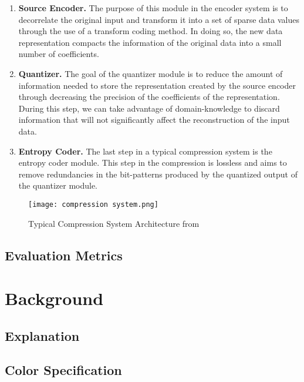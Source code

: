 \documentclass[review,onefignum,onetabnum]{siamart190516}
\begin{document}
\begin{enumerate}[label=\textbf{(\alph*)}]
  \item \textbf{Source Encoder.} 
  The purpose of this module in the encoder system is to decorrelate the original
  input and transform it into a set of sparse data values through the use of a 
  transform coding method. In doing so, the new data representation compacts the
  information of the original data into a small number of coefficients.

  \item \textbf{Quantizer.}
  The goal of the quantizer module is to reduce the amount of information needed
  to store the representation created by the source encoder through decreasing 
  the precision of the coefficients of the representation. During this step,
  we can take advantage of domain-knowledge to discard information that will not
  significantly affect the reconstruction of the input data.

  \item \textbf{Entropy Coder.}
  The last step in a typical compression system is the entropy coder module.
  This step in the compression is lossless and aims to remove redundancies in the
  bit-patterns produced by the quantized output of the quantizer module.
\end{enumerate}

\begin{figure}[tbhp]
  \centering
  \texttt{[image: compression system.png]}
  \caption{Typical Compression System Architecture from \cite{raid2014jpeg}}
  \label{fig:compression-arch}
\end{figure}

\subsection{Evaluation Metrics}
\lipsum[10-11]

\section{Background}
\subsection{Explanation}
\lipsum[12]

\subsection{Color Specification}
\lipsum[13-14]
\end{document}
